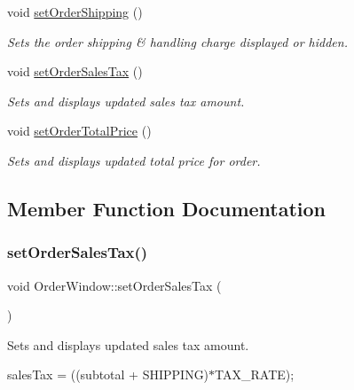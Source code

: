 \begin{DoxyCompactItemize}
void \mbox{\hyperlink{class_order_window_aa2a0cfb3003fd66954cc540dd9db23b8}{set\+Order\+Shipping}} ()
\begin{DoxyCompactList}\small\item\em Sets the order shipping \& handling charge displayed or hidden. \end{DoxyCompactList}\item 
void \mbox{\hyperlink{class_order_window_a6dfbb77a1a8911cc789062c6c00b7fe5}{set\+Order\+Sales\+Tax}} ()
\begin{DoxyCompactList}\small\item\em Sets and displays updated sales tax amount. \end{DoxyCompactList}\item 
void \mbox{\hyperlink{class_order_window_af1b6d198cf89a68c63afa28bc986786a}{set\+Order\+Total\+Price}} ()
\begin{DoxyCompactList}\small\item\em Sets and displays updated total price for order. \end{DoxyCompactList}\end{DoxyCompactItemize}


\subsection{Member Function Documentation}
\mbox{\label{class_order_window_a6dfbb77a1a8911cc789062c6c00b7fe5}} 
\subsubsection{\texorpdfstring{setOrderSalesTax()}{setOrderSalesTax()}}
{\footnotesize\ttfamily void Order\+Window\+::set\+Order\+Sales\+Tax (\begin{DoxyParamCaption}{ }\end{DoxyParamCaption})}



Sets and displays updated sales tax amount. 

sales\+Tax = ((subtotal + S\+H\+I\+P\+P\+I\+NG)$\ast$\+T\+A\+X\+\_\+\+R\+A\+TE); \mbox{\label{class_order_window_aa2a0cfb3003fd66954cc540dd9db23b8}} 
